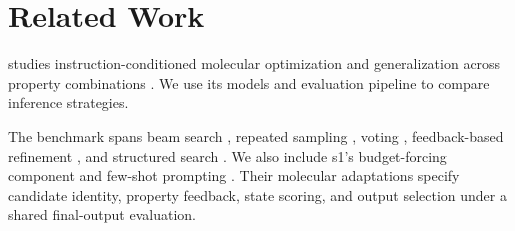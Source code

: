 \section{Related Work}
\label{sec:related-work}
\gellmo{} studies instruction-conditioned molecular optimization and generalization across property combinations \citep{gellmo2025}. We use its models and evaluation pipeline to compare inference strategies.

The benchmark spans beam search \citep{beam2014}, repeated sampling \citep{repeatedsampling2024}, voting \citep{voting2024}, feedback-based refinement \citep{selfrefine2023,reflexion2023}, and structured search \citep{tot2023,got2024}. We also include s1's budget-forcing component \citep{s1_2025} and few-shot prompting \citep{brown2020}. Their molecular adaptations specify candidate identity, property feedback, state scoring, and output selection under a shared final-output evaluation.
